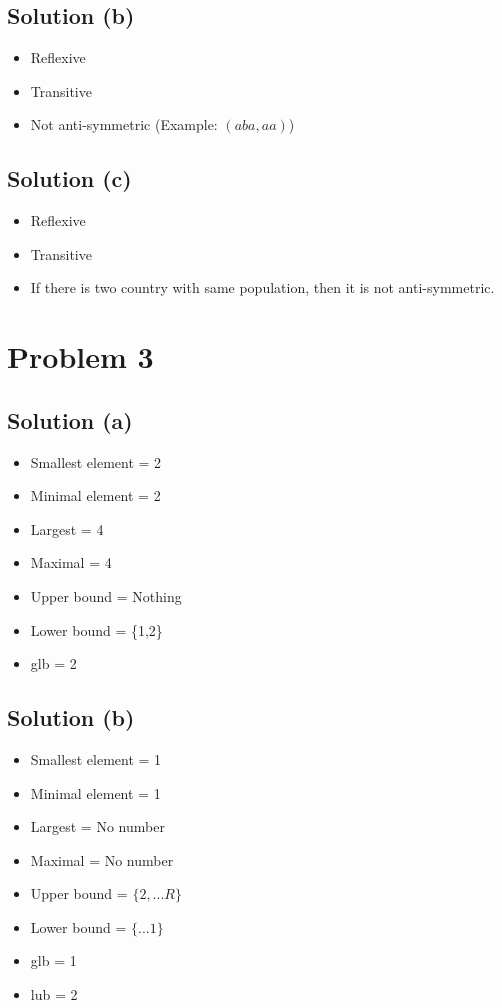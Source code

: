 \documentclass{article}
\begin{document}
\subsection{Solution (b)}
\begin{itemize}
\item Reflexive
\item Transitive
\item Not anti-symmetric (Example: $(aba, aa)$)
\end{itemize}

\subsection{Solution (c)}
\begin{itemize}
\item Reflexive
\item Transitive
\item If there is two country with same population, then it is not anti-symmetric.
\end{itemize}

\section{Problem 3}
\subsection{Solution (a)}
\begin{itemize}
\item Smallest element = 2
\item Minimal element = 2
\item Largest = 4
\item Maximal =  4
\item Upper bound = Nothing
\item Lower bound =  \{1,2\}
\item glb = 2
\end{itemize}

\subsection{Solution (b)}
\begin{itemize}
\item Smallest element = 1
\item Minimal element = 1
\item Largest = No number
\item Maximal = No number
\item Upper bound = $\{2, ... R\}$
\item Lower bound = $\{... 1\}$
\item glb = 1
\item lub = 2
\end{itemize}
\end{document}
